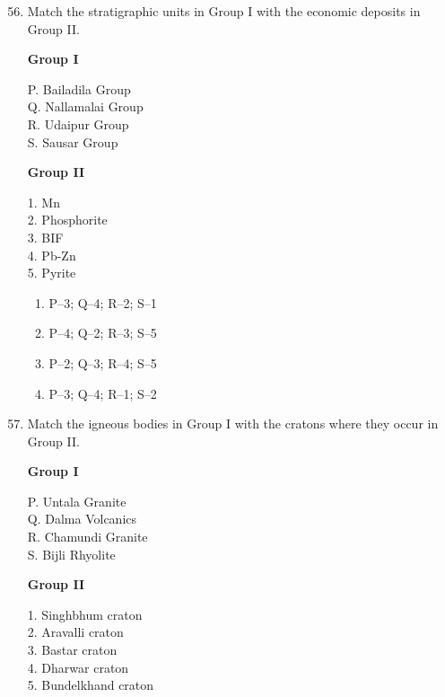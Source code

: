 \documentclass[journal,12pt,onecolumn]{IEEEtran}
\theoremstyle{remark}
\begin{document}
\begin{enumerate}
\setcounter{enumi}{55}

\item Match the stratigraphic units in Group I with the economic deposits in Group II.

\begin{multicols}{2}
\textbf{Group I}  
\begin{flushleft}
P. Bailadila Group\\
Q. Nallamalai Group\\
R. Udaipur Group\\
S. Sausar Group
\end{flushleft}

\columnbreak

\textbf{Group II}  
\begin{flushleft}
1. Mn\\
2. Phosphorite\\
3. BIF\\
4. Pb-Zn\\
5. Pyrite
\end{flushleft}
\end{multicols}

\begin{multicols}{2}
\begin{enumerate}
\item P--3; Q--4; R--2; S--1  
\item P--4; Q--2; R--3; S--5  
\item P--2; Q--3; R--4; S--5  
\item P--3; Q--4; R--1; S--2  
\end{enumerate}
\end{multicols}

\item Match the igneous bodies in Group I with the cratons where they occur in Group II.

\begin{multicols}{2}
\textbf{Group I}  
\begin{flushleft}
P. Untala Granite\\
Q. Dalma Volcanics\\
R. Chamundi Granite\\
S. Bijli Rhyolite
\end{flushleft}

\columnbreak

\textbf{Group II}  
\begin{flushleft}
1. Singhbhum craton\\
2. Aravalli craton\\
3. Bastar craton\\
4. Dharwar craton\\
5. Bundelkhand craton
\end{flushleft}
\end{multicols}


\end{enumerate}
\end{document}
